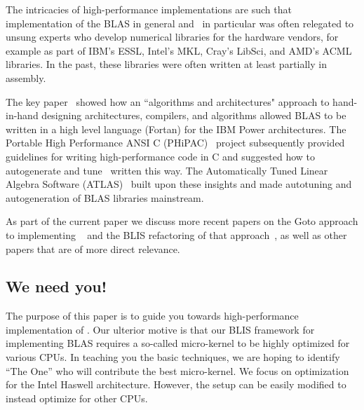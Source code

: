 The intricacies of high-performance implementations are such that implementation of the BLAS in general and \Gemm\ in particular was 
often relegated to 
unsung experts who develop numerical libraries for the hardware vendors, for example as part of IBM's ESSL, Intel's MKL, Cray's LibSci, and AMD's ACML libraries.  In the past,
these libraries were often written at least partially in assembly.

The key paper~\cite{IBM:P2} showed how an ``algorithms and architectures" approach to hand-in-hand designing architectures, compilers, and algorithms allowed 
BLAS to be written in a high level language (Fortan) for the IBM Power architectures.
The Portable High Performance ANSI C (PHiPAC)~\cite{PHiPAC97} project subsequently provided guidelines for writing high-performance code in C and suggested how to autogenerate and tune \Gemm\ written this way.  The Automatically Tuned Linear Algebra Software (ATLAS)~\cite{ATLAS,ATLAS_journal} built upon these insights and made autotuning and autogeneration of BLAS libraries mainstream.

As part of the current paper we discuss more recent papers on the Goto approach to implementing \Gemm~\cite{Goto:2008:AHP} and the BLIS refactoring of that approach~\cite{BLIS1}, as well as other papers that are of more direct relevance.  

\subsection{We need you!}

The purpose of this paper is to guide you towards high-performance
implementation of \Gemm.  Our ulterior motive is that our BLIS framework for implementing BLAS requires a so-called micro-kernel to be highly optimized for various CPUs.  In teaching you the basic techniques, we are hoping to identify  ``The One'' who will contribute the best micro-kernel.
We focus on optimization for the Intel Haswell architecture.  However, the setup can be easily modified to instead optimize for other CPUs.
